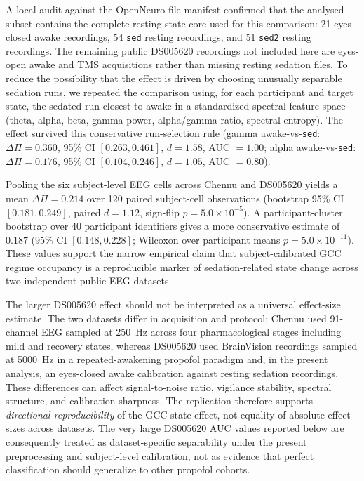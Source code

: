 \documentclass[11pt,a4paper]{article}
\theoremstyle{plain}
\theoremstyle{definition}
\theoremstyle{remark}
\begin{document}
A local audit against the OpenNeuro file manifest confirmed that the analysed subset contains the complete resting-state core used for this comparison: 21 eyes-closed awake recordings, 54 \texttt{sed} resting recordings, and 51 \texttt{sed2} resting recordings. The remaining public DS005620 recordings not included here are eyes-open awake and TMS acquisitions rather than missing resting sedation files. To reduce the possibility that the effect is driven by choosing unusually separable sedation runs, we repeated the comparison using, for each participant and target state, the sedated run closest to awake in a standardized spectral-feature space (theta, alpha, beta, gamma power, alpha/gamma ratio, spectral entropy). The effect survived this conservative run-selection rule (gamma awake-vs-\texttt{sed}: $\Delta\Pi=0.360$, 95\% CI $[0.263,0.461]$, $d=1.58$, AUC $=1.00$; alpha awake-vs-\texttt{sed}: $\Delta\Pi=0.176$, 95\% CI $[0.104,0.246]$, $d=1.05$, AUC $=0.80$).

Pooling the six subject-level EEG cells across Chennu and DS005620 yields a mean $\Delta\Pi = 0.214$ over 120 paired subject-cell observations (bootstrap 95\% CI $[0.181,0.249]$, paired $d=1.12$, sign-flip $p=5.0\times10^{-5}$). A participant-cluster bootstrap over 40 participant identifiers gives a more conservative estimate of $0.187$ (95\% CI $[0.148,0.228]$; Wilcoxon over participant means $p=5.0\times10^{-11}$). These values support the narrow empirical claim that subject-calibrated GCC regime occupancy is a reproducible marker of sedation-related state change across two independent public EEG datasets.

The larger DS005620 effect should not be interpreted as a universal effect-size estimate. The two datasets differ in acquisition and protocol: Chennu used 91-channel EEG sampled at 250~Hz across four pharmacological stages including mild and recovery states, whereas DS005620 used BrainVision recordings sampled at 5000~Hz in a repeated-awakening propofol paradigm and, in the present analysis, an eyes-closed awake calibration against resting sedation recordings. These differences can affect signal-to-noise ratio, vigilance stability, spectral structure, and calibration sharpness. The replication therefore supports \emph{directional reproducibility} of the GCC state effect, not equality of absolute effect sizes across datasets. The very large DS005620 AUC values reported below are consequently treated as dataset-specific separability under the present preprocessing and subject-level calibration, not as evidence that perfect classification should generalize to other propofol cohorts.
\end{document}
